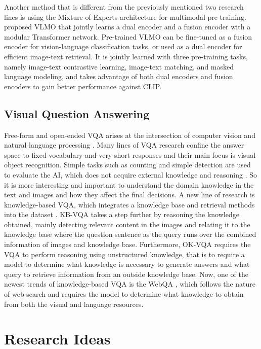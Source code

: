 \documentclass[nohyperref]{article}
\theoremstyle{plain}
\theoremstyle{definition}
\theoremstyle{remark}
\begin{document}
    Another method that is different from the previously mentioned two research lines is using the Mixture-of-Experts architecture for multimodal pre-training. \citet{VLMO} proposed VLMO that jointly learns a dual encoder and a fusion encoder with a modular Transformer network. Pre-trained VLMO can be fine-tuned as a fusion encoder for vision-language classification tasks, or used as a dual encoder for efficient image-text retrieval. It is jointly learned with three pre-training tasks, namely image-text contrastive learning, image-text matching, and masked language modeling, and takes advantage of both dual encoders and fusion encoders to gain better performance against CLIP.

    \subsection{Visual Question Answering}
    Free-form and open-ended VQA arises at the intersection of computer vision and natural language processing \cite{antol2015vqa}. Many lines of VQA research confine the answer space to fixed vocabulary and very short responses and their main focus is visual object recognition. Simple tasks such as counting and simple detection are used to evaluate the AI, which does not acquire external knowledge and reasoning \citep{visual7w}. So it is more interesting and important to understand the domain knowledge in the text and images and how they affect the final decisions. A new line of research is knowledge-based VQA, which integrates a knowledge base and retrieval methods into the dataset \citep{https://doi.org/10.48550/arxiv.1809.01124, kbvqa}. KB-VQA \citep{kbvqa} takes a step further by reasoning the knowledge obtained, mainly detecting relevant content in the images and relating it to the knowledge base where the question sentence as the query runs over the combined information of images and knowledge base. Furthermore, OK-VQA \citep{okvqa} requires the VQA to perform reasoning using unstructured knowledge, that is to require a model to determine what knowledge is necessary to generate answers and what query to retrieve information from an outside knowledge base. Now, one of the newest trends of knowledge-based VQA is the WebQA \citep{webqa}, which follows the nature of web search and requires the model to determine what knowledge to obtain from both the visual and language resources.


    \section{Research Ideas}
\end{document}
